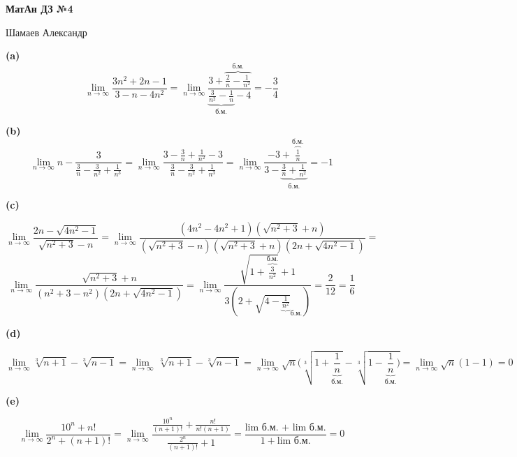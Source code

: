 \documentclass{article}
\begin{document}
\setlength{\parindent}{0pt}
\begin{Large}
    \textsf{\textbf{МатАн ДЗ №4}}
    
    Шамаев Александр    
\end{Large}
\vspace{1cm}

\textsf{\textbf{(a)}}
\[\lim\limits_{n \to \infty} \frac{3n^2 + 2n - 1}{3 - n - 4n^2} = \lim\limits_{n \to \infty} \frac{3 + \overbrace{\frac{2}{n} - \frac{1}{n^2}}^{\text{б.м.}}}{\underbrace{\frac{3}{n^2} - \frac{1}{n}}_{\text{б.м.}
} - 4} = \boxed{- \frac{3}{4}} \]


\textsf{\textbf{(b)}}
\[
\lim\limits_{n \to \infty} n - \frac{3}{\frac{3}{n} - \frac{3}{n^2} + \frac{1}{n^3}} = 
\lim\limits_{n \to \infty} \frac{3 - \frac{3}{n} + \frac{1}{n^2} - 3}{\frac{3}{n} - \frac{3}{n^2} + \frac{1}{n^3}} = \lim\limits_{n \to \infty} \frac{-3 + \overbrace{\frac{1}{n}}^{\text{б.м.}}}{3 - \underbrace{\frac{3}{n} + \frac{1}{n^2}}_{\text{б.м.}}} = \boxed{-1}
\]

\textsf{\textbf{(c)}}
\begin{center}
    
\[
\lim\limits_{n \to \infty} \frac{2n - \sqrt{4n^2 - 1}}{\sqrt{n^2 + 3} - n} = 
\lim\limits_{n \to \infty} \frac{(4n^2 - 4n^2 + 1)(\sqrt{n^2 + 3} + n)}{(\sqrt{n^2 + 3} - n)(\sqrt{n^2 + 3} + n)(2n + \sqrt{4n^2 - 1})} = 
\]
\[
\lim\limits_{n \to \infty} \frac{\sqrt{n^2 + 3} + n}{(n^2 + 3 - n^2)(2n + \sqrt{4n^2 - 1})} = 
\lim\limits_{n \to \infty} \frac{\sqrt{1 + \overbrace{\frac{3}{n^2}}^{\text{б.м.}}} + 1}{3(2 + \sqrt{4 - \underbrace{\frac{1}{n^2}}}_{\text{б.м.}})} = 
 \frac{2}{12} = \boxed{\frac{1}{6}}
\]
\end{center}

\textsf{\textbf{(d)}}
\begin{center}
   \[
   \lim\limits_{n \to \infty} \sqrt[3]{n+1} - \sqrt[3]{n - 1} = 
   \lim\limits_{n \to \infty} \frac{}{} \sqrt[3]{n+1} - \sqrt[3]{n - 1} = 
   \lim\limits_{n \to \infty} \sqrt{n}(\sqrt[3]{1+\underbrace{\frac{1}{n}}_{\text{б.м.}}} - \sqrt[3]{1 - \underbrace{\frac{1}{n}}_{\text{б.м.}})} = \lim\limits_{n \to \infty} \sqrt{n} (1 - 1) = \boxed{0}
   \] 
\end{center}

\textsf{\textbf{(e)}}
\begin{center}
\[
\lim\limits_{n \to \infty} \frac{10^n + n!}{2^n + (n + 1)!} = 
\lim\limits_{n \to \infty} \frac{\frac{10^n}{(n + 1)!} + \frac{n!}{n!(n + 1)}}{\frac{2^n}{(n + 1)!} + 1} = \frac{\text{lim б.м. + lim б.м.}}{1 + \text{lim б.м.}} = \boxed{0}
\]    
\end{center}
\end{document}
